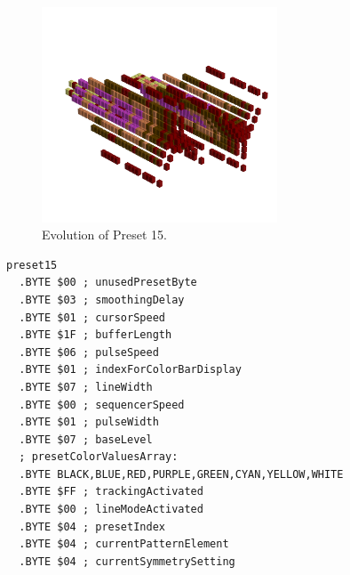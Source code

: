 \clearpage
\begin{minipage}[b]{0.48\linewidth}
\begin{figure}[H]                                                          
  \centering                                                             
  \begin{adjustbox}{width=7cm,center}                                   
  \includegraphics[width=7cm]{src/presets/pattern14-45.png}%
  \end{adjustbox}                                                        
\caption{Evolution of Preset 15.}                                           
\end{figure}                                                               
                                                                 
                                                                           
\end{minipage}
\hspace{0.1cm}
\begin{minipage}[b]{0.48\linewidth}                                       
\begin{lstlisting}[basicstyle=\ttfamily\scriptsize,caption=Data structure for Preset 15.]
preset15
  .BYTE $00 ; unusedPresetByte
  .BYTE $03 ; smoothingDelay
  .BYTE $01 ; cursorSpeed
  .BYTE $1F ; bufferLength
  .BYTE $06 ; pulseSpeed
  .BYTE $01 ; indexForColorBarDisplay
  .BYTE $07 ; lineWidth
  .BYTE $00 ; sequencerSpeed
  .BYTE $01 ; pulseWidth
  .BYTE $07 ; baseLevel
  ; presetColorValuesArray: 
  .BYTE BLACK,BLUE,RED,PURPLE,GREEN,CYAN,YELLOW,WHITE
  .BYTE $FF ; trackingActivated
  .BYTE $00 ; lineModeActivated
  .BYTE $04 ; presetIndex
  .BYTE $04 ; currentPatternElement
  .BYTE $04 ; currentSymmetrySetting
\end{lstlisting}
\end{minipage}


